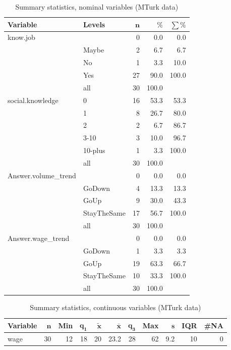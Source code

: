 \documentclass[a4paper,10pt]{article}\usepackage[]{graphicx}\usepackage[]{color}
\begin{document}
\begin{table}[ht]
\centering
{\footnotesize
\begin{tabular}{ll|rrr}
 \textbf{Variable} & \textbf{Levels} & $\mathbf{n}$ & $\mathbf{\%}$ & $\mathbf{\sum \%}$ \\ 
  \hline
know.job &  & 0 & 0.0 & 0.0 \\ 
   & Maybe & 2 & 6.7 & 6.7 \\ 
   & No & 1 & 3.3 & 10.0 \\ 
   & Yes & 27 & 90.0 & 100.0 \\ 
   \hline
 & all & 30 & 100.0 &  \\ 
   \hline
\hline
social.knowledge & 0 & 16 & 53.3 & 53.3 \\ 
   & 1 & 8 & 26.7 & 80.0 \\ 
   & 2 & 2 & 6.7 & 86.7 \\ 
   & 3-10 & 3 & 10.0 & 96.7 \\ 
   & 10-plus & 1 & 3.3 & 100.0 \\ 
   \hline
 & all & 30 & 100.0 &  \\ 
   \hline
\hline
Answer.volume\_trend &  & 0 & 0.0 & 0.0 \\ 
   & GoDown & 4 & 13.3 & 13.3 \\ 
   & GoUp & 9 & 30.0 & 43.3 \\ 
   & StayTheSame & 17 & 56.7 & 100.0 \\ 
   \hline
 & all & 30 & 100.0 &  \\ 
   \hline
\hline
Answer.wage\_trend &  & 0 & 0.0 & 0.0 \\ 
   & GoDown & 1 & 3.3 & 3.3 \\ 
   & GoUp & 19 & 63.3 & 66.7 \\ 
   & StayTheSame & 10 & 33.3 & 100.0 \\ 
   \hline
 & all & 30 & 100.0 &  \\ 
   \hline
\hline
\end{tabular}
}
\caption{Summary statistics, nominal variables (MTurk data)} 
\label{tab1:47-2150}
\end{table}
\begin{table}[ht]
\centering
{\footnotesize
\begin{tabular}{lrrrrrrrrrr}
 \textbf{Variable} & $\mathbf{n}$ & \textbf{Min} & $\mathbf{q_1}$ & $\mathbf{\widetilde{x}}$ & $\mathbf{\bar{x}}$ & $\mathbf{q_3}$ & \textbf{Max} & $\mathbf{s}$ & \textbf{IQR} & \textbf{\#NA} \\ 
  \hline
wage & 30 & 12 & 18 & 20 & 23.2 & 28 & 62 & 9.2 & 10 & 0 \\ 
  \end{tabular}
}
\caption{Summary statistics, continuous variables (MTurk data)} 
\label{tab2:47-2150}
\end{table}
\end{document}
